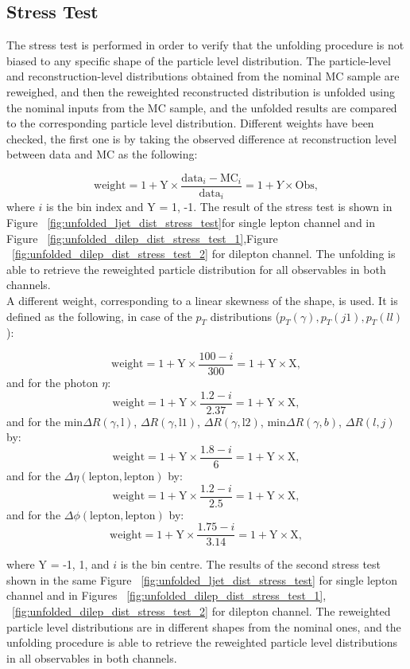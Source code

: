 \subsection{Stress Test}
\label{sec:stress_test}
The stress test is performed in order to verify that the unfolding procedure is not biased to any specific shape of the particle level distribution. The particle-level and reconstruction-level distributions obtained from the nominal MC sample are reweighed, and then the reweighted reconstructed distribution is unfolded using the nominal inputs from the MC sample, and the unfolded results are compared to the corresponding particle level distribution. Different weights have been checked, the first one is by taking the observed difference at reconstruction level between data and MC as the following:

$$ \mathrm{weight} = 1 + \mathrm{Y} \times \frac{\mathrm{data}_i - \mathrm{MC}_i}{\mathrm{data}_i} = 1 + Y \times \mathrm{Obs}, $$
where $i$ is the bin index and Y = 1, -1. The result of the stress test is shown in Figure ~\ref{fig:unfolded_ljet_dist_stress_test}for single lepton channel and in Figure ~\ref{fig:unfolded_dilep_dist_stress_test_1},Figure ~\ref{fig:unfolded_dilep_dist_stress_test_2} for dilepton channel. The unfolding is able to retrieve the reweighted particle distribution for all observables in both channels. \\

A different weight, corresponding to a linear skewness of the shape, is used. It is defined as the following, in case of the $p_T$ distributions ($p_T(\gamma), p_T(j1), p_T(ll)$):

$$ \mathrm{weight} = 1 + \mathrm{Y} \times \frac{100 - i}{300} = 1 + \mathrm{Y} \times \mathrm{X}, $$
and for the photon $\eta$:
$$ \mathrm{weight} = 1 + \mathrm{Y} \times \frac{1.2 - i}{2.37} = 1 + \mathrm{Y} \times \mathrm{X}, $$
and for the $ \mathrm{min} \Delta R(\gamma, \mathrm{l})$, $\Delta R(\gamma, \mathrm{l1})$, 
$\Delta R(\gamma, \mathrm{l2})$,  $\mathrm{min} \Delta R(\gamma, b)$, $\Delta R(l, j)$ by:
$$ \mathrm{weight} = 1 + \mathrm{Y} \times \frac{1.8 - i}{6} = 1 + \mathrm{Y} \times \mathrm{X}, $$
and for the $ \Delta \eta (\mathrm{lepton},\mathrm{lepton}) $ by:
$$ \mathrm{weight} = 1 + \mathrm{Y} \times \frac{1.2 - i}{2.5} = 1 + \mathrm{Y} \times \mathrm{X}, $$
and for the $ \Delta \phi (\mathrm{lepton}, \mathrm{lepton}) $ by:
$$ \mathrm{weight} = 1 + \mathrm{Y} \times \frac{1.75 - i}{3.14} = 1 + \mathrm{Y} \times \mathrm{X}, $$

where Y = -1, 1, and $i$ is the bin centre. The results of the second stress test 
shown in the same Figure ~\ref{fig:unfolded_ljet_dist_stress_test} for 
single lepton channel and in Figures ~\ref{fig:unfolded_dilep_dist_stress_test_1}, 
~\ref{fig:unfolded_dilep_dist_stress_test_2} for dilepton channel. The reweighted particle level distributions are in different shapes from the nominal ones, and the unfolding procedure is able to retrieve the reweighted particle level distributions in all observables in both channels.


